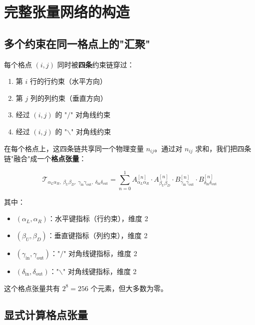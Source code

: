 \documentclass[12pt,a4paper]{ctexart}
\begin{document}
\section{完整张量网络的构造}

\subsection{多个约束在同一格点上的"汇聚"}

每个格点 $(i,j)$ 同时被\textbf{四条}约束链穿过：
\begin{enumerate}
    \item 第 $i$ 行的行约束（水平方向）
    \item 第 $j$ 列的列约束（垂直方向）
    \item 经过 $(i,j)$ 的 "$/$" 对角线约束
    \item 经过 $(i,j)$ 的 "$\backslash$" 对角线约束
\end{enumerate}

在每个格点上，这四条链共享同一个物理变量 $n_{ij}$。通过对 $n_{ij}$ 求和，我们把四条链"融合"成一个\textbf{格点张量}：

\begin{equation}
\boxed{
\mathcal{T}_{\alpha_L \alpha_R,\; \beta_U \beta_D,\; \gamma_{\text{in}} \gamma_{\text{out}},\; \delta_{\text{in}} \delta_{\text{out}}} = \sum_{n=0}^{1} A^{[n]}_{\alpha_L \alpha_R} \cdot A^{[n]}_{\beta_U \beta_D} \cdot B^{[n]}_{\gamma_{\text{in}} \gamma_{\text{out}}} \cdot B^{[n]}_{\delta_{\text{in}} \delta_{\text{out}}}
}
\end{equation}

其中：
\begin{itemize}
    \item $(\alpha_L, \alpha_R)$：水平键指标（行约束），维度 2
    \item $(\beta_U, \beta_D)$：垂直键指标（列约束），维度 2
    \item $(\gamma_{\text{in}}, \gamma_{\text{out}})$："$/$" 对角线键指标，维度 2
    \item $(\delta_{\text{in}}, \delta_{\text{out}})$："$\backslash$" 对角线键指标，维度 2
\end{itemize}

这个格点张量共有 $2^8 = 256$ 个元素，但大多数为零。

\subsection{显式计算格点张量}
\end{document}
